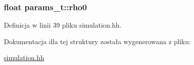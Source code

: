 \subsubsection[{rho0}]{\setlength{\rightskip}{0pt plus 5cm}float params\+\_\+t\+::rho0}\label{structparams__t_a2eb309edb681d0a998f23fc692a73781}


Definicja w linii 39 pliku simulation.\+hh.



Dokumentacja dla tej struktury została wygenerowana z pliku\+:\begin{DoxyCompactItemize}
\item 
\hyperlink{simulation_8hh}{simulation.\+hh}\end{DoxyCompactItemize}
